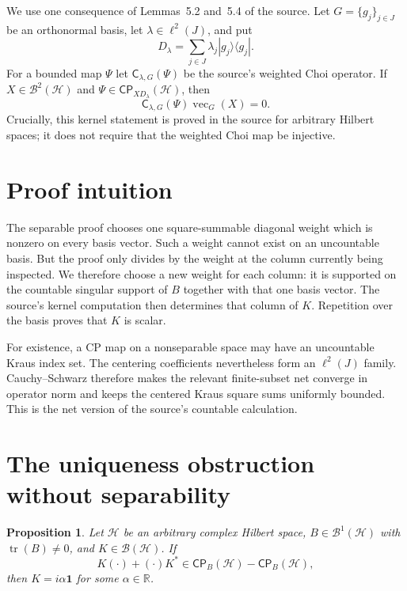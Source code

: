 \documentclass[11pt]{article}
\newtheorem{proposition}[theorem]{Proposition}
\newcommand{\Hh}{\mathcal H}
\newcommand{\Bcal}{\mathcal B}
\newcommand{\CP}{\mathsf{CP}}
\newcommand{\tr}{\operatorname{tr}}
\newcommand{\id}{\mathbf 1}
\newcommand{\Cw}{\mathsf C}
\newcommand{\vecg}{\operatorname{vec}}
\begin{document}
We use one consequence of Lemmas~5.2 and~5.4 of the source.  Let
$G=\{g_j\}_{j\in J}$ be an orthonormal basis, let
$\lambda\in\ell^2(J)$, and put
\[
 D_\lambda=\sum_{j\in J}\lambda_j|g_j\rangle\langle g_j|.
\]
For a bounded map $\Psi$ let $\Cw_{\lambda,G}(\Psi)$ be the source's weighted
Choi operator.  If $X\in\Bcal^2(\Hh)$ and
$\Psi\in\CP_{XD_\lambda}(\Hh)$, then
\begin{equation}\label{eq:kernel-tool}
 \Cw_{\lambda,G}(\Psi)\vecg_G(X)=0.
\end{equation}
Crucially, this kernel statement is proved in the source for arbitrary
Hilbert spaces; it does not require that the weighted Choi map be injective.

\section{Proof intuition}

The separable proof chooses one square-summable diagonal weight which is
nonzero on every basis vector.  Such a weight cannot exist on an uncountable
basis.  But the proof only divides by the weight at the column currently
being inspected.  We therefore choose a new weight for each column: it is
supported on the countable singular support of $B$ together with that one
basis vector.  The source's kernel computation then determines that column of
$K$.  Repetition over the basis proves that $K$ is scalar.

For existence, a CP map on a nonseparable space may have an uncountable Kraus
index set.  The centering coefficients nevertheless form an $\ell^2(J)$
family.  Cauchy--Schwarz therefore makes the relevant finite-subset net
converge in operator norm and keeps the centered Kraus square sums uniformly
bounded.  This is the net version of the source's countable calculation.

\section{The uniqueness obstruction without separability}

\begin{proposition}\label{prop:obstruction}
Let $\Hh$ be an arbitrary complex Hilbert space,
$B\in\Bcal^1(\Hh)$ with $\tr(B)\ne0$, and $K\in\Bcal(\Hh)$.  If
\[
 K(\cdot)+(\cdot)K^*\in
 \CP_B(\Hh)-\CP_B(\Hh),
\]
then $K=i\alpha\id$ for some $\alpha\in\mathbb R$.
\end{proposition}
\end{document}
